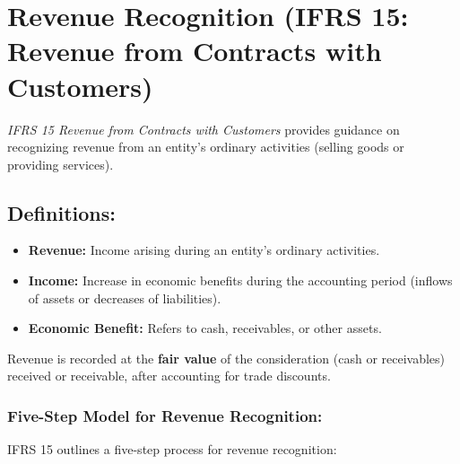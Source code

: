 \section{Revenue Recognition (IFRS 15: Revenue from Contracts with Customers)}

\textit{IFRS 15 Revenue from Contracts with Customers} provides guidance on recognizing revenue from an entity's ordinary activities (selling goods or providing services).

\subsection*{Definitions:}

\begin{itemize}
    \item \textbf{Revenue:} Income arising during an entity's ordinary activities.
    \item \textbf{Income:} Increase in economic benefits during the accounting period (inflows of assets or decreases of liabilities).
    \item \textbf{Economic Benefit:} Refers to cash, receivables, or other assets.
\end{itemize}

Revenue is recorded at the \textbf{fair value} of the consideration (cash or receivables) received or receivable, after accounting for trade discounts.

\subsubsection*{Five-Step Model for Revenue Recognition:}

IFRS 15 outlines a five-step process for revenue recognition:

